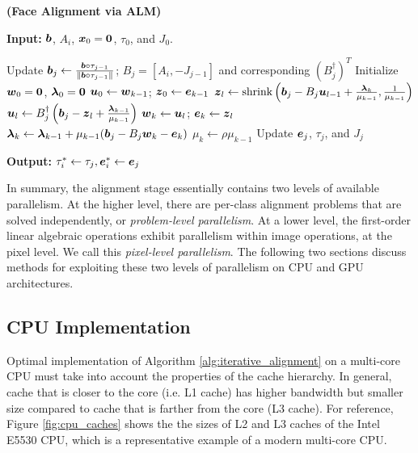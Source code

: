 \begin{algorithm}[ht!]
\caption{\bf (Face Alignment via ALM)} \label{alg:iterative_alignment}
\small
{\bf Input:} $\boldsymbol{b}$, $A_i$, ${\boldsymbol{x}}_0 = \boldsymbol{0}$, $\tau_0$, and $J_0$.
\begin{algorithmic}[1]
\STATE Update $\boldsymbol{b}_j \leftarrow \frac{\boldsymbol{b}\circ \tau_{j-1}}{\|\boldsymbol{b}\circ \tau_{j-1}\|}$; $B_j= [A_i, -J_{j-1}]$ and corresponding $(B_j^\dagger)^T$
\STATE Initialize ${\boldsymbol{w}}_0 = \boldsymbol 0$, $\boldsymbol{\lambda}_0 = \boldsymbol 0$
\STATE ${\boldsymbol{u}}_0\leftarrow {\boldsymbol{w}}_{k-1}$; ${\boldsymbol{z}}_0\leftarrow \boldsymbol{e}_{k-1}$
\STATE ${\boldsymbol{z}}_l \leftarrow {\text{shrink}}\left(\boldsymbol{b}_j - B_j{\boldsymbol{u}}_{l-1} + \frac{\boldsymbol{\lambda}_{k}}{\mu_{k-1}}, \frac{1}{\mu_{k-1}}\right)$
\STATE ${\boldsymbol{u}}_l \leftarrow B_j^\dagger \left(\boldsymbol{b}_j - {\boldsymbol{z}}_{l} + \frac{\boldsymbol{\lambda}_{k-1}}{\mu_{k-1}} \right) $
\ENDWHILE
\STATE ${\boldsymbol{w}}_k \leftarrow {\boldsymbol{u}}_l$; $\boldsymbol{e}_k \leftarrow {\boldsymbol{z}}_l$
\STATE $\boldsymbol{\lambda}_{k} \leftarrow \boldsymbol{\lambda}_{k-1} + \mu_{k-1} (\boldsymbol{b}_j - B_j{\boldsymbol{w}}_{k} - \boldsymbol{e}_{k})$
\STATE $\mu_{k} \leftarrow \rho\mu_{k-1}$
\ENDWHILE
\STATE Update $\boldsymbol{e}_j$, $\tau_j$, and $J_j$
\ENDWHILE
\end{algorithmic}
{\bf Output:} $\tau_i^*\leftarrow \tau_j, \boldsymbol{e}_i^*\leftarrow \boldsymbol{e}_j$
\end{algorithm}

In summary, the alignment stage essentially contains two levels of available
parallelism. At the higher level, there are per-class alignment problems
that are solved independently, or \emph{problem-level parallelism}.  At a lower
level, the first-order linear algebraic operations exhibit parallelism within
image operations, \ie at the pixel level.  We call this \emph{pixel-level
parallelism}.  The following two sections discuss methods for exploiting
these two levels of parallelism on CPU and GPU architectures.

\subsection{CPU Implementation} 
\label{sec:alignment_implementation_cpu}

Optimal implementation of Algorithm \ref{alg:iterative_alignment} on a multi-core CPU must take 
into account the properties of the cache hierarchy. In general, cache that is 
closer to the core (i.e. L1 cache) has higher bandwidth but smaller size compared to cache
that is farther from the core (L3 cache).  For reference, Figure \ref{fig:cpu_caches} 
shows the the sizes of L2 and L3 caches of the Intel E5530 CPU, 
which is a representative example of a modern multi-core CPU. 

